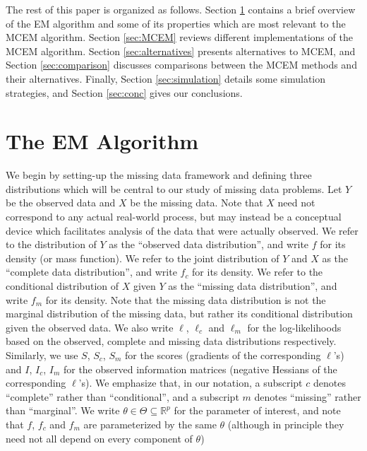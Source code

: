 \documentclass[11pt, oneside]{article}   	%
\newcommand{\bR}{\mathbb{R}}
\begin{document}
The rest of this paper is organized as follows. Section \ref{sec:EM} contains a brief overview of the EM algorithm and some of its properties which are most relevant to the MCEM algorithm. Section \ref{sec:MCEM} reviews different implementations of the MCEM algorithm. Section \ref{sec:alternatives} presents alternatives to MCEM, and Section \ref{sec:comparison} discusses comparisons between the MCEM methods and their alternatives. Finally, Section \ref{sec:simulation} details some simulation strategies, and Section \ref{sec:conc} gives our conclusions.



\section{The EM Algorithm}
\label{sec:EM}

We begin by setting-up the missing data framework and defining three distributions which will be central to our study of missing data problems. Let $Y$ be the observed data and $X$ be the missing data. Note that $X$ need not correspond to any actual real-world process, but may instead be a conceptual device which facilitates analysis of the data that were actually observed. We refer to the distribution of $Y$ as the ``observed data distribution'', and write $f$ for its density (or mass function). We refer to the joint distribution of $Y$ and $X$ as the ``complete data distribution'', and write $f_c$ for its density. We refer to the conditional distribution of $X$ given $Y$ as the ``missing data distribution'', and write $f_m$ for its density. Note that the missing data distribution is not the marginal distribution of the missing data, but rather its conditional distribution given the observed data. We also write $\ell$, $\ell_c$ and $\ell_m$ for the log-likelihoods based on the observed, complete and missing data distributions respectively. Similarly, we use $S$, $S_c$, $S_m$ for the scores (gradients of the corresponding $\ell$'s) and $I$, $I_c$, $I_m$ for the observed information matrices (negative Hessians of the corresponding $\ell$'s). We emphasize that, in our notation, a subscript $c$ denotes ``complete'' rather than ``conditional'', and a subscript $m$ denotes ``missing'' rather than ``marginal''. We write $\theta \in \Theta \subseteq \bR^p$ for the parameter of interest, and note that $f$, $f_c$ and $f_m$ are parameterized by the same $\theta$ (although in principle they need not all depend on every component of $\theta$)
\end{document}
